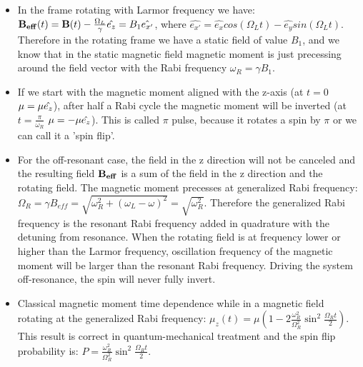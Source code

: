 \documentclass[AtomicOptical1Notes.tex]{subfiles}
\begin{document}
\begin{itemize}
			\item In the frame rotating with Larmor frequency we have: $ \mathbf{B_{eff}}(t) = \mathbf{B}(t) - \frac{\Omega_L}{\gamma}\hat{e_z} = B_1\hat{e_{x'}} $, where $ \hat{e_{x'}} = \hat{e_x}cos(\Omega_L t) - \hat{e_y}sin(\Omega_L t) $. Therefore in the rotating frame we have a static field of value $ B_1 $, and we know that in the static magnetic field magnetic moment is just precessing around the field vector with the Rabi frequency $ \omega_R = \gamma B_1 $.
			\item If we start with the magnetic moment aligned with the z-axis (at $t=0$ $\mathbf{\mu}=\mu\hat{e_z}$), after half a Rabi cycle the magnetic moment will be inverted (at $t=\frac{\pi}{\omega_R}$ $\mathbf{\mu}=-\mu\hat{e_z}$). This is called $\pi$ pulse, because it rotates a spin by $\pi$ or we can call it a 'spin flip'.
			\item For the off-resonant case, the field in the z direction will not be canceled and the resulting field $\mathbf{B_{eff}}$ is a sum of the field in the z direction and the rotating field. The magnetic moment precesses at generalized Rabi frequency: $ \Omega_R = \gamma B_{eff} = \sqrt{\omega_R^2+(\omega_L-\omega)^2} = \sqrt{\omega_R^2} $. Therefore the generalized Rabi frequency is the resonant Rabi frequency added in quadrature with the detuning from resonance. When the rotating field is at frequency lower or higher than the Larmor frequency, oscillation frequency of the magnetic moment will be larger than the resonant Rabi frequency. Driving the system off-resonance, the spin will never fully invert.
			\item Classical magnetic moment time dependence while in a magnetic field rotating at the generalized Rabi frequency: $ \mu_z(t) = \mu \left( 1 - 2 \frac{\omega_R^2}{\Omega_R^2} \sin^2 \frac{\Omega_R t}{2} \right) $. This result is correct in quantum-mechanical treatment and the spin flip probability is: $ P= \frac{\omega_R^2}{\Omega_R^2} \sin^2 \frac{\Omega_R t}{2} $.
		\end{itemize}
		
\end{document}
